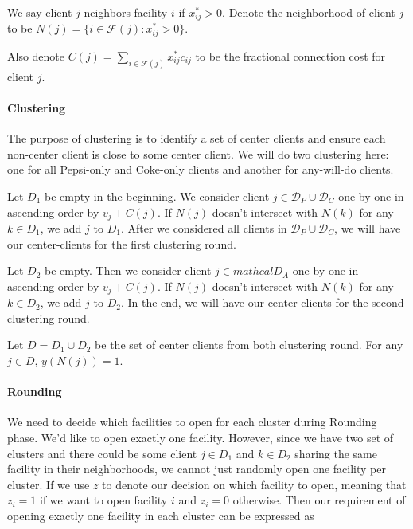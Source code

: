\begin{defn}
We say client $j$ neighbors facility $i$ if $x^*_{ij} > 0$.
Denote the neighborhood of client $j$ to be $N(j) = \{i \in \mathcal{F}(j) : x^*_{ij} > 0 \}$.
\end{defn}

Also denote $C(j) = \sum_{i \in \mathcal{F}(j)} x^*_{ij}c_{ij}$
to be the fractional connection cost for client $j$.

\paragraph{Clustering} The purpose of clustering is to identify a set of center clients and
ensure each non-center client is close to some center client.
We will do two clustering here: one for all Pepsi-only and Coke-only clients and another
for any-will-do clients.

Let $D_1$ be empty in the beginning. We consider client $j \in \mathcal{D}_P \cup \mathcal{D}_C$
one by one in ascending order by $v_j + C(j)$. If $N(j)$ doesn't intersect with $N(k)$
for any $k \in D_1$, we add $j$ to $D_1$. After we considered all clients in $\mathcal{D}_P \cup \mathcal{D}_C$,
we will have our center-clients for the first clustering round.

Let $D_2$ be empty. Then we consider client $j \in mathcal{D}_A$ one by one
in ascending order by $v_j + C(j)$.
If $N(j)$ doesn't intersect with $N(k)$ for any $k \in D_2$, we add $j$ to $D_2$.
In the end, we will have our center-clients for the second clustering round.

\begin{fact}
Let $D = D_1 \cup D_2$ be the set of center clients from both clustering round.
For any $j \in D$, $y(N(j)) = 1$.
\end{fact}

\paragraph{Rounding} We need to decide which facilities to open for each cluster during Rounding phase.
We'd like to open exactly one facility.
However, since we have two set of clusters and there could be some client $j \in D_1$ and $k \in D_2$
sharing the same facility in their neighborhoods, we cannot just randomly open one facility per cluster.
If we use $z$ to denote our decision on which facility to open,
meaning that $z_i = 1$ if we want to open facility $i$ and $z_i = 0$ otherwise.
Then our requirement of opening exactly one facility in each cluster can be expressed as


